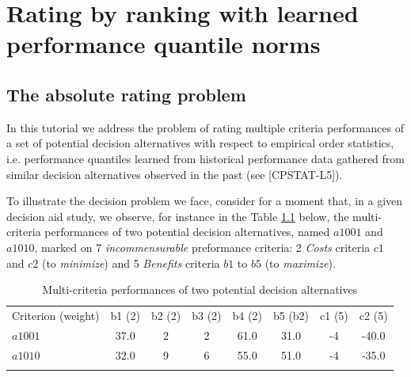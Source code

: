 \chapter{Rating by ranking with learned performance quantile norms}
\label{sec:10}



\section{The absolute rating problem}
\label{sec:10.1}
	  
In this tutorial we address the problem of rating multiple criteria performances of a set of potential decision alternatives with respect to empirical order statistics, i.e. performance quantiles learned from historical performance data gathered from similar decision alternatives observed in the past (see [CPSTAT-L5]).

To illustrate the decision problem we face, consider for a moment that, in a given decision aid study, we observe, for instance in the Table \ref{tab:10.1} below, the multi-criteria performances of two potential decision alternatives, named $a1001$ and $a1010$, marked on 7 \emph{incommensurable} preformance criteria: 2 \emph{Costs} criteria $c1$ and $c2$ (to \emph{minimize}) and 5 \emph{Benefits} criteria $b1$ to $b5$ (to \emph{maximize}). 

\begin{table}[h]
\caption{Multi-criteria performances of two potential decision alternatives}
\label{tab:10.1}       %
\begin{center}
    \begin{tabular}{l|c|c|c|c|c|c|c}
      \hline\noalign{\smallskip}
      Criterion (weight) & b1 (2) & b2 (2) & b3 (2) & b4 (2) & b5 (b2) & c1 (5) & c2 (5)\\
      \noalign{\smallskip}\hline\noalign{\smallskip}
    $a1001$ &   37.0  &  2 & 2 & 61.0 & 31.0 & -4 & -40.0\\
    $a1010$ &   32.0 & 9 & 6 & 55.0 & 51.0 & -4 & -35.0 \\
      \noalign{\smallskip}\hline
    \end{tabular}
\end{center}
\end{table}

